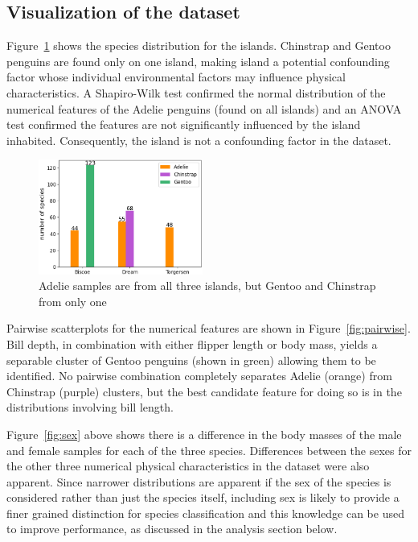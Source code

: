 \documentclass[12pt]{article}
\begin{document}
\subsection*{Visualization of the dataset}

Figure~\ref{fig:islands} shows the species distribution for the islands. 
Chinstrap and Gentoo penguins are found only on one island, making island a potential confounding factor whose 
individual environmental factors may influence physical characteristics. 
A Shapiro-Wilk test confirmed the normal distribution of the numerical features of the Adelie penguins (found on 
all islands) and an ANOVA test confirmed the features are not significantly influenced by the island inhabited. 
Consequently, the island is not a confounding factor in the dataset.

\begin{figure} %
  \centering
  \vspace{-1.5\baselineskip} %
  \includegraphics[width=0.48\textwidth]{islands.png} %
  \vspace{-0.5\baselineskip} %
  \caption{Adelie samples are from all three islands, but Gentoo and Chinstrap from only one}
  \vspace{-1.5\baselineskip} %
  \label{fig:islands}
\end{figure}

Pairwise scatterplots for the numerical features are shown in Figure~\ref{fig:pairwise}. 
Bill depth, in combination with either flipper length or body mass, 
yields a separable cluster of Gentoo penguins (shown in green) allowing them to be identified. 
No pairwise combination completely separates Adelie (orange) from Chinstrap (purple) clusters, 
but the best candidate feature for doing so is in the distributions involving bill length.

Figure~\ref{fig:sex} above shows there is a difference in the body masses of the male and female samples for each of the three species. 
Differences between the sexes for the other three numerical physical characteristics in the dataset were also apparent. 
Since narrower distributions are apparent if the sex of the species is considered rather than just the species itself, 
including sex is likely to provide a finer grained distinction for species classification 
and this knowledge can be used to improve performance, as discussed in the analysis section below. 
\end{document}
